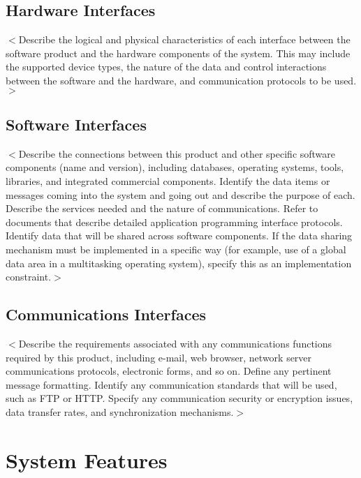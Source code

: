 \documentclass{scrreprt}
\begin{document}
\section{Hardware Interfaces}
$<$Describe the logical and physical characteristics of each interface between 
the software product and the hardware components of the system. This may include 
the supported device types, the nature of the data and control interactions 
between the software and the hardware, and communication protocols to be 
used.$>$

\section{Software Interfaces}
$<$Describe the connections between this product and other specific software 
components (name and version), including databases, operating systems, tools, 
libraries, and integrated commercial components. Identify the data items or 
messages coming into the system and going out and describe the purpose of each.  
Describe the services needed and the nature of communications. Refer to 
documents that describe detailed application programming interface protocols.  
Identify data that will be shared across software components. If the data 
sharing mechanism must be implemented in a specific way (for example, use of a 
global data area in a multitasking operating system), specify this as an 
implementation constraint.$>$

\section{Communications Interfaces}
$<$Describe the requirements associated with any communications functions 
required by this product, including e-mail, web browser, network server 
communications protocols, electronic forms, and so on. Define any pertinent 
message formatting. Identify any communication standards that will be used, such 
as FTP or HTTP. Specify any communication security or encryption issues, data 
transfer rates, and synchronization mechanisms.$>$


\chapter{System Features}
\end{document}

